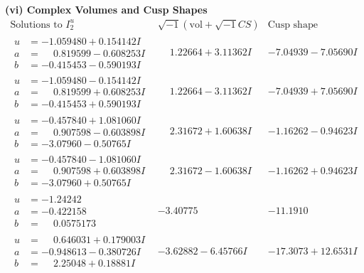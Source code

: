\documentclass[1p]{elsarticle_modified}
\theoremstyle{definition}
\newcommand{\I}{\sqrt{-1}}
\begin{document}
\newpage\flushleft \textbf{(vi) Complex Volumes and Cusp Shapes}
$$\begin{array}{c|c|c}  
\text{Solutions to }I^u_{2}& \I (\text{vol} + \sqrt{-1}CS) & \text{Cusp shape}\\
 \hline 
\begin{aligned}
u &= -1.059480 + 0.154142 I \\
a &= \phantom{-}0.819599 - 0.608253 I \\
b &= -0.415453 - 0.590193 I\end{aligned}
 & \phantom{-}1.22664 + 3.11362 I & -7.04939 - 7.05690 I \\ \hline\begin{aligned}
u &= -1.059480 - 0.154142 I \\
a &= \phantom{-}0.819599 + 0.608253 I \\
b &= -0.415453 + 0.590193 I\end{aligned}
 & \phantom{-}1.22664 - 3.11362 I & -7.04939 + 7.05690 I \\ \hline\begin{aligned}
u &= -0.457840 + 1.081060 I \\
a &= \phantom{-}0.907598 - 0.603898 I \\
b &= -3.07960 - 0.50765 I\end{aligned}
 & \phantom{-}2.31672 + 1.60638 I & -1.16262 - 0.94623 I \\ \hline\begin{aligned}
u &= -0.457840 - 1.081060 I \\
a &= \phantom{-}0.907598 + 0.603898 I \\
b &= -3.07960 + 0.50765 I\end{aligned}
 & \phantom{-}2.31672 - 1.60638 I & -1.16262 + 0.94623 I \\ \hline\begin{aligned}
u &= -1.24242\phantom{ +0.000000I} \\
a &= -0.422158\phantom{ +0.000000I} \\
b &= \phantom{-}0.0575173\phantom{ +0.000000I}\end{aligned}
 & -3.40775\phantom{ +0.000000I} & -11.1910\phantom{ +0.000000I} \\ \hline\begin{aligned}
u &= \phantom{-}0.646031 + 0.179003 I \\
a &= -0.948613 - 0.380726 I \\
b &= \phantom{-}2.25048 + 0.18881 I\end{aligned}
 & -3.62882 - 6.45766 I & -17.3073 + 12.6531 I \\ \hline\begin{aligned}

\end{aligned}
\end{array}$$
\end{document}
